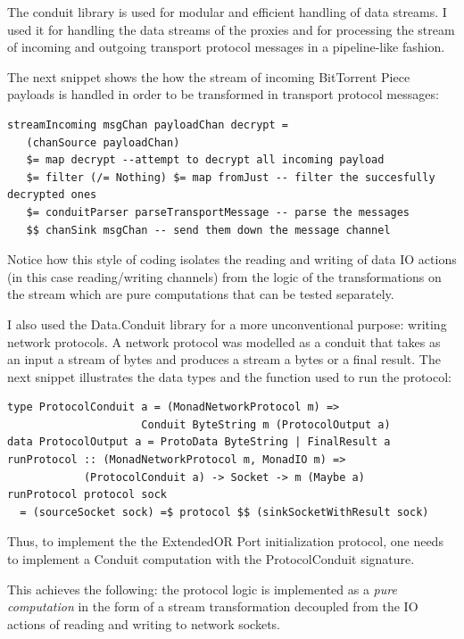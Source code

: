 \documentclass[11pt]{article} %
\begin{document}

The conduit library is used for modular and efficient handling of data streams. I used it for handling the data streams of the proxies and for processing the stream of incoming and outgoing transport protocol messages  in a pipeline-like fashion.

The next snippet shows the how the stream of incoming BitTorrent Piece payloads is handled in order to be transformed in transport protocol messages:

\begin{lstlisting}
streamIncoming msgChan payloadChan decrypt =
   (chanSource payloadChan)
   $= map decrypt --attempt to decrypt all incoming payload
   $= filter (/= Nothing) $= map fromJust -- filter the succesfully decrypted ones
   $= conduitParser parseTransportMessage -- parse the messages
   $$ chanSink msgChan -- send them down the message channel
\end{lstlisting}

Notice how this style of coding isolates the reading and writing of data IO actions (in this case reading/writing channels) from the logic of the transformations on the stream which are pure computations that can be tested separately.

I also used the Data.Conduit library for a more unconventional purpose: writing network protocols. A network protocol was modelled as a conduit that takes as an input a stream of bytes and produces a stream a bytes or a final result. The next snippet illustrates the data types and the function used to run the protocol:

\begin{lstlisting}
type ProtocolConduit a = (MonadNetworkProtocol m) =>
					 Conduit ByteString m (ProtocolOutput a)
data ProtocolOutput a = ProtoData ByteString | FinalResult a
runProtocol :: (MonadNetworkProtocol m, MonadIO m) =>
			(ProtocolConduit a) -> Socket -> m (Maybe a)
runProtocol protocol sock
  = (sourceSocket sock) =$ protocol $$ (sinkSocketWithResult sock)
\end{lstlisting}

Thus, to implement the the ExtendedOR Port initialization protocol, one needs to implement a Conduit computation with the ProtocolConduit signature.

This achieves the following: the protocol logic is implemented as a \textit{pure computation}  in the form of a stream transformation decoupled from the IO actions of reading and writing to network sockets.
\end{document}
